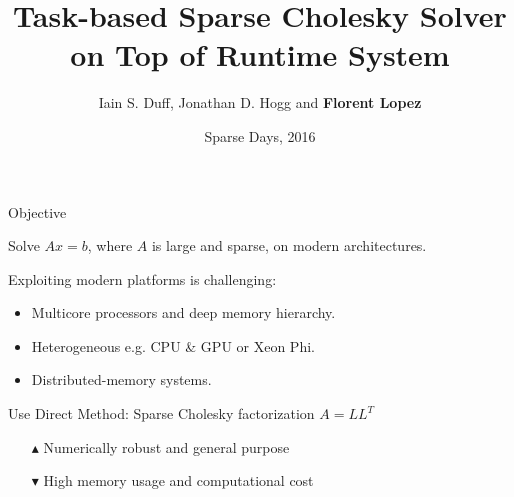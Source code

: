 \documentclass{beamer}
\author{Iain S. Duff, Jonathan D. Hogg and {\bf Florent Lopez}}
\institute{Rutherford Appleton Laboratory
  \\ \alert{NLAFET Project}}
\title{Task-based Sparse Cholesky Solver on Top of Runtime System}
\date{Sparse Days, 2016}
\newcommand{\dg}[1]{\textcolor{mgreen}{#1\xspace}}
\newcommand{\dr}[1]{\textcolor{mred}{#1\xspace}}
\newcommand{\db}[1]{\textcolor{mblue}{#1\xspace}}
\begin{document}
\begin{frame}[t,plain]
\titlepage
\end{frame}

\begin{frame}{Objective}

  Solve \alert{$Ax=b$}, where $A$ is \db{large} and \db{sparse}, on
  modern architectures.

  \vspace{0.5cm}

  Exploiting modern platforms is challenging:
  \begin{itemize}
  \item \db{Multicore} processors and deep \db{memory hierarchy}.
  \item \db{Heterogeneous} e.g. CPU \& GPU or Xeon Phi.
  \item \db{Distributed-memory} systems. 
  \end{itemize}

  \vspace{0.5cm}
  
  Use \db{Direct Method}: Sparse Cholesky factorization $A=LL^{T}$
  \begin{itemize}
  \item[\dg{$\blacktriangle$}] Numerically robust and general purpose
  \item[\dr{$\blacktriangledown$}] High memory usage and computational cost
  \end{itemize}

\end{frame}
\end{document}
